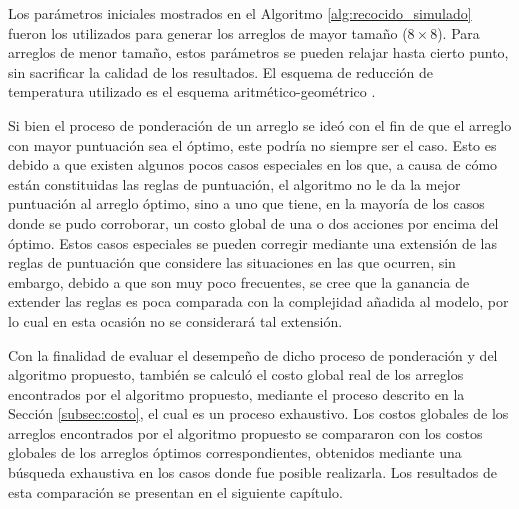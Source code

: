 Los parámetros iniciales mostrados en el Algoritmo \ref{alg:recocido_simulado} fueron los utilizados para generar los arreglos de mayor tamaño ($8\times 8$).
Para arreglos de menor tamaño, estos parámetros se pueden relajar hasta cierto punto, sin sacrificar la calidad de los resultados.
El esquema de reducción de temperatura utilizado es el esquema aritmético-geométrico \cite{ouali2017performance}.

Si bien el proceso de ponderación de un arreglo se ideó con el fin de que el arreglo con mayor puntuación sea el óptimo, este podría no siempre ser el caso.
Esto es debido a que existen algunos pocos casos especiales en los que, a causa de cómo están constituidas las reglas de puntuación, el algoritmo no le da la mejor puntuación al arreglo óptimo, sino a uno que tiene, en la mayoría de los casos donde se pudo corroborar, un costo global de una o dos acciones por encima del óptimo.
Estos casos especiales se pueden corregir mediante una extensión de las reglas de puntuación que considere las situaciones en las que ocurren, sin embargo, debido a que son muy poco frecuentes, se cree que la ganancia de extender las reglas es poca comparada con la complejidad añadida al modelo, por lo cual en esta ocasión no se considerará tal extensión.

Con la finalidad de evaluar el desempeño de dicho proceso de ponderación y del algoritmo propuesto, también se calculó el costo global real de los arreglos encontrados por el algoritmo propuesto, mediante el proceso descrito en la Sección \ref{subsec:costo}, el cual es un proceso exhaustivo.
Los costos globales de los arreglos encontrados por el algoritmo propuesto se compararon con los costos globales de los arreglos óptimos correspondientes, obtenidos mediante una búsqueda exhaustiva en los casos donde fue posible realizarla.
Los resultados de esta comparación se presentan en el siguiente capítulo.